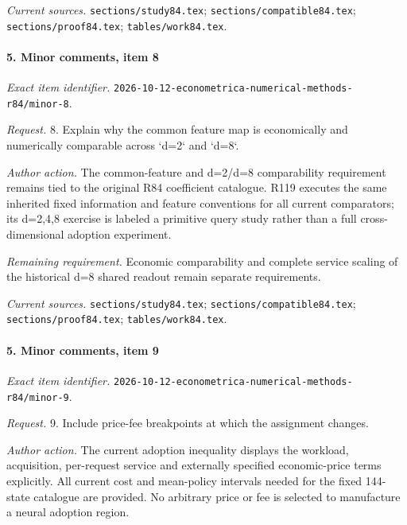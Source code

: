 \par\emph{Current sources.} \nolinkurl{sections/study84.tex}; \nolinkurl{sections/compatible84.tex}; \nolinkurl{sections/proof84.tex}; \nolinkurl{tables/work84.tex}.

\paragraph{5. Minor comments, item 8}

\emph{Exact item identifier.} \nolinkurl{2026-10-12-econometrica-numerical-methods-r84/minor-8}.

\par\emph{Request.} 8. Explain why the common feature map is economically and numerically comparable across `d=2` and `d=8`.

\par\emph{Author action.} The common-feature and d=2/d=8 comparability requirement remains tied to the original R84 coefficient catalogue. R119 executes the same inherited fixed information and feature conventions for all current comparators; its d=2,4,8 exercise is labeled a primitive query study rather than a full cross-dimensional adoption experiment.

\par\emph{Remaining requirement.} Economic comparability and complete service scaling of the historical d=8 shared readout remain separate requirements.

\par\emph{Current sources.} \nolinkurl{sections/study84.tex}; \nolinkurl{sections/compatible84.tex}; \nolinkurl{sections/proof84.tex}; \nolinkurl{tables/work84.tex}.

\paragraph{5. Minor comments, item 9}

\emph{Exact item identifier.} \nolinkurl{2026-10-12-econometrica-numerical-methods-r84/minor-9}.

\par\emph{Request.} 9. Include price-fee breakpoints at which the assignment changes.

\par\emph{Author action.} The current adoption inequality displays the workload, acquisition, per-request service and externally specified economic-price terms explicitly. All current cost and mean-policy intervals needed for the fixed 144-state catalogue are provided. No arbitrary price or fee is selected to manufacture a neural adoption region.

